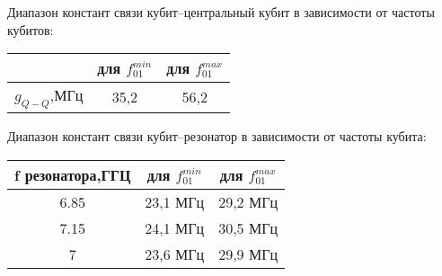 \documentclass[12pt, twoside]{report}
\begin{document}
Диапазон констант связи кубит--центральный кубит в зависимости от частоты кубитов:
	\begin{center}
		\begin{tabular}{ | c | c | c |}
  	  	\hline
   		  &для $f_{01}^{min}$ &для $f_{01}^{max}$ \\ \hline
    		  $g_{Q-Q}$,МГц &35,2  & 56,2 \\ \hline
		\end{tabular}
	\end{center} 
	
Диапазон констант связи кубит--резонатор в зависимости от частоты кубита:
	\begin{center}
		\begin{tabular}{ | c | c | c |}
  	  	\hline
   		  f резонатора,ГГЦ&для $f_{01}^{min}$ &для $f_{01}^{max}$ \\ \hline
    		  6.85 &23,1 МГц & 29,2 МГц \\ \hline
    		  7.15 &24,1 МГц & 30,5 МГц \\ \hline
   	 	  7 &23,6 МГц & 29,9 МГц \\ \hline
		\end{tabular}
	\end{center} 
	
	
	
	
\end{document}
